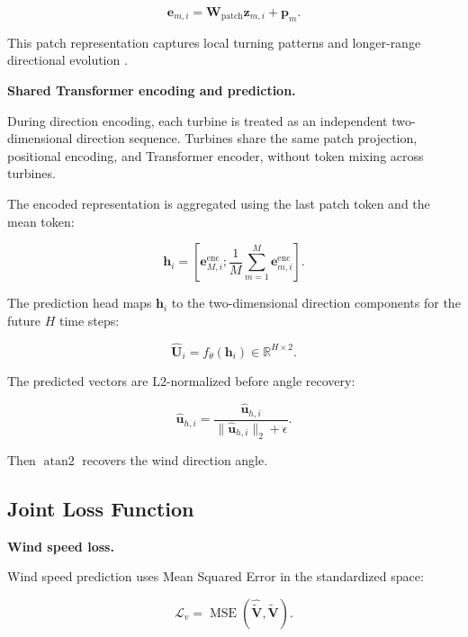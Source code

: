 \begin{equation}
\mathbf{e}_{m,i} = \mathbf{W}_{\mathrm{patch}}\mathbf{z}_{m,i} + \mathbf{p}_m.
\end{equation}

This patch representation captures local turning patterns and longer-range directional evolution \cite{Zerveas2021TimeSeriesRepresentation,Nie2024ChannelAwareLowRankAdaptation}.

\textbf{Shared Transformer encoding and prediction.}

During direction encoding, each turbine is treated as an independent two-dimensional direction sequence. Turbines share the same patch projection, positional encoding, and Transformer encoder, without token mixing across turbines.

The encoded representation is aggregated using the last patch token and the mean token:

\begin{equation}
\mathbf{h}_i = \left[ \mathbf{e}_{M,i}^{\mathrm{enc}}; \frac{1}{M} \sum_{m=1}^{M} \mathbf{e}_{m,i}^{\mathrm{enc}} \right].
\end{equation}

The prediction head maps $\mathbf{h}_i$ to the two-dimensional direction components for the future $H$ time steps:

\begin{equation}
\hat{\mathbf{U}}_i = f_{\theta}(\mathbf{h}_i) \in \mathbb{R}^{H\times 2}.
\end{equation}

The predicted vectors are L2-normalized before angle recovery:

\begin{equation}
\hat{\mathbf{u}}_{h,i} = \frac{\hat{\mathbf{u}}_{h,i}}{\|\hat{\mathbf{u}}_{h,i}\|_2+\epsilon}.
\end{equation}

Then $\operatorname{atan2}$ recovers the wind direction angle.

\subsection{Joint Loss Function}

\textbf{Wind speed loss.}

Wind speed prediction uses Mean Squared Error in the standardized space:

\begin{equation}
\mathcal{L}_{v} = \operatorname{MSE} \left( \hat{\tilde{\mathbf{V}}}, \tilde{\mathbf{V}} \right).
\end{equation}

